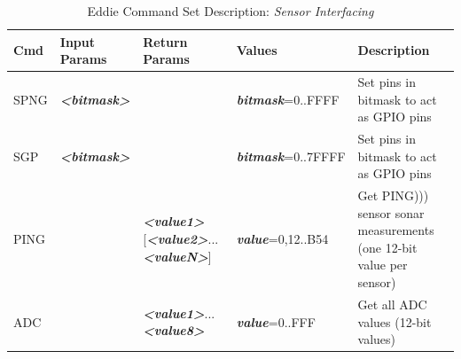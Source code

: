 \begin{table}[H]
\caption{Eddie Command Set Description: \textit{Sensor Interfacing}}
\label{tab:eddie_commands}
\begin{tabular}{|p{3em}|p{4.5em}|p{8.5em}|p{7.5em}|p{14em}|}
\hline
\textbf{\large Cmd} & \textbf{\large Input Params} & \textbf{\large Return Params} & \textbf{\large Values} & \textbf{\large Description} \\ \hline \hline
SPNG & \textit{\textbf{<bitmask>}} &  & \textit{\textbf{bitmask}}=0..FFFF & Set pins in bitmask to act as GPIO pins \\ \hline
SGP & \textit{\textbf{<bitmask>}} &  & \textit{\textbf{bitmask}}=0..7FFFF & Set pins in bitmask to act as GPIO pins \\ \hline
PING & & \textit{\textbf{<value1>}}[\textit{\textbf{<value2>}}\newline...\textit{\textbf{<valueN>}}] & \textit{\textbf{value}}=0,12..B54 & Get PING))) sensor sonar measurements (one 12-bit value per sensor) \\ \hline
ADC &  & \textit{\textbf{<value1>}}...\textit{\textbf{<value8>}} & \textit{\textbf{value}}=0..FFF & Get all ADC values (12-bit values) \\ \hline
\end{tabular}
\end{table}

